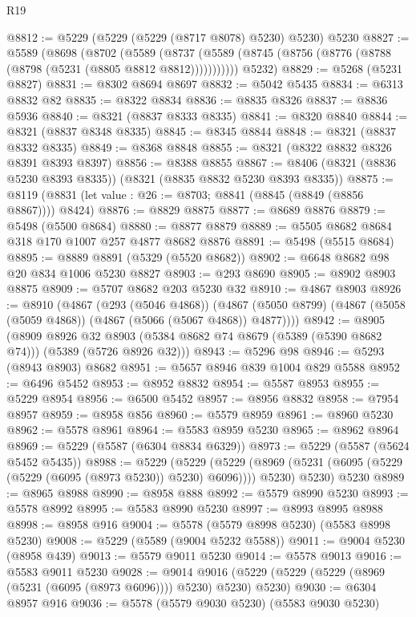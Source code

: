 \begin{lexlean}{R19}
\begin{coremodule}
@8812 := @5229 (@5229 (@5229 (@8717 @8078) @5230) @5230) @5230
@8827 := @5589
    (@8698
      (@8702
        (@5589 (@8737 (@5589 (@8745 (@8756 (@8776 (@8788 (@8798 (@5231 (@8805 @8812 @8812)))))))))))
      @5232)
@8829 := @5268 (@5231 @8827)
@8831 := @8302 @8694 @8697
@8832 := @5042 @5435
@8834 := @6313 @8832 @82
@8835 := @8322 @8834
@8836 := @8835 @8326
@8837 := @8836 @5936
@8840 := @8321 (@8837 @8333 @8335)
@8841 := @8320 @8840
@8844 := @8321 (@8837 @8348 @8335)
@8845 := @8345 @8844
@8848 := @8321 (@8837 @8332 @8335)
@8849 := @8368 @8848
@8855 := @8321 (@8322 @8832 @8326 @8391 @8393 @8397)
@8856 := @8388 @8855
@8867 := @8406 (@8321 (@8836 @5230 @8393 @8335)) (@8321 (@8835 @8832 @5230 @8393 @8335))
@8875 := @8119 (@8831 (let value : @26 := @8703; @8841 (@8845 (@8849 (@8856 @8867)))) @8424)
@8876 := @8829 @8875
@8877 := @8689 @8876
@8879 := @5498 (@5500 @8684)
@8880 := @8877 @8879
@8889 := @5505 @8682 @8684 @318 @170 @1007 @257 @4877 @8682 @8876
@8891 := @5498 (@5515 @8684)
@8895 := @8889 @8891 (@5329 (@5520 @8682))
@8902 := @6648 @8682 @98 @20 @834 @1006 @5230 @8827
@8903 := @293 @8690
@8905 := @8902 @8903 @8875
@8909 := @5707 @8682 @203 @5230 @32
@8910 := @4867 @8903
@8926 := @8910
    (@4867
      (@293 (@5046 @4868))
      (@4867 (@5050 @8799) (@4867 (@5058 (@5059 @4868)) (@4867 (@5066 (@5067 @4868)) @4877))))
@8942 := @8905
    (@8909
      @8926
      @32
      @8903
      (@5384 @8682 @74 @8679 (@5389 (@5390 @8682 @74)))
      (@5389 (@5726 @8926 @32)))
@8943 := @5296 @98
@8946 := @5293 (@8943 @8903) @8682
@8951 := @5657 @8946 @839 @1004 @829 @5588
@8952 := @6496 @5452
@8953 := @8952 @8832
@8954 := @5587 @8953
@8955 := @5229 @8954
@8956 := @6500 @5452
@8957 := @8956 @8832
@8958 := @7954 @8957
@8959 := @8958 @856
@8960 := @5579 @8959
@8961 := @8960 @5230
@8962 := @5578 @8961
@8964 := @5583 @8959 @5230
@8965 := @8962 @8964
@8969 := @5229 (@5587 (@6304 @8834 @6329))
@8973 := @5229 (@5587 (@5624 @5452 @5435))
@8988 := @5229
    (@5229
      (@5229 (@8969 (@5231 (@6095 (@5229 (@5229 (@6095 (@8973 @5230)) @5230) @6096)))) @5230)
      @5230)
    @5230
@8989 := @8965 @8988
@8990 := @8958 @888
@8992 := @5579 @8990 @5230
@8993 := @5578 @8992
@8995 := @5583 @8990 @5230
@8997 := @8993 @8995 @8988
@8998 := @8958 @916
@9004 := @5578 (@5579 @8998 @5230) (@5583 @8998 @5230)
@9008 := @5229 (@5589 (@9004 @5232 @5588))
@9011 := @9004 @5230 (@8958 @439)
@9013 := @5579 @9011 @5230
@9014 := @5578 @9013
@9016 := @5583 @9011 @5230
@9028 := @9014 @9016 (@5229 (@5229 (@5229 (@8969 (@5231 (@6095 (@8973 @6096)))) @5230) @5230) @5230)
@9030 := @6304 @8957 @916
@9036 := @5578 (@5579 @9030 @5230) (@5583 @9030 @5230)

\end{coremodule}
\end{lexlean}
